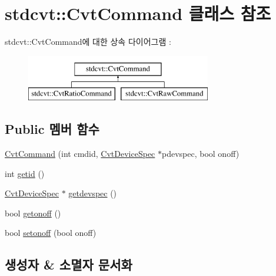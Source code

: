 \hypertarget{classstdcvt_1_1CvtCommand}{}\section{stdcvt\+:\+:Cvt\+Command 클래스 참조}
\label{classstdcvt_1_1CvtCommand}
stdcvt\+:\+:Cvt\+Command에 대한 상속 다이어그램 \+: \begin{figure}[H]
\begin{center}
\leavevmode
\includegraphics[height=2.000000cm]{classstdcvt_1_1CvtCommand}
\end{center}
\end{figure}
\subsection*{Public 멤버 함수}
\begin{DoxyCompactItemize}
\item 
\hyperlink{classstdcvt_1_1CvtCommand_a3af3fce4d86c505aae0f44eea9c7a461}{Cvt\+Command} (int cmdid, \hyperlink{classstdcvt_1_1CvtDeviceSpec}{Cvt\+Device\+Spec} $\ast$pdevspec, bool onoff)
\item 
int \hyperlink{classstdcvt_1_1CvtCommand_a108a615897723b8adaf8d826f1273529}{getid} ()
\item 
\hyperlink{classstdcvt_1_1CvtDeviceSpec}{Cvt\+Device\+Spec} $\ast$ \hyperlink{classstdcvt_1_1CvtCommand_ae494f768b0b6d72fe6e03d2ac29e162b}{getdevspec} ()
\item 
bool \hyperlink{classstdcvt_1_1CvtCommand_a6fcd400fd5e627a688a06edcfbcaa210}{getonoff} ()
\item 
bool \hyperlink{classstdcvt_1_1CvtCommand_a933894d3d822018066d4761d56e091f7}{setonoff} (bool onoff)
\end{DoxyCompactItemize}


\subsection{생성자 \& 소멸자 문서화}
